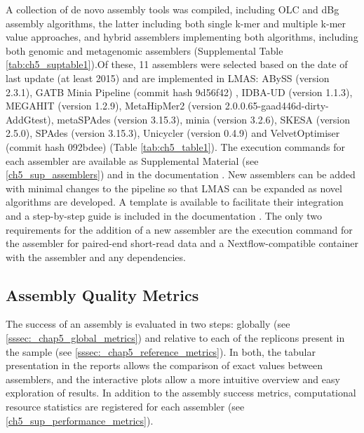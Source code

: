 A collection of de novo assembly tools was compiled, including \ac{OLC} and \ac{dBg} assembly algorithms, the latter including both single k-mer and multiple k-mer value approaches, and hybrid assemblers implementing both algorithms, including both genomic and metagenomic assemblers (Supplemental Table \ref{tab:ch5_suptable1}).Of these, 11 assemblers were selected based on the date of last update (at least 2015) and are implemented in LMAS: ABySS \cite{jackman_abyss_2017} (version 2.3.1), GATB Minia Pipeline \cite{noauthor_gatbgatb-minia-pipeline_2022} (commit hash 9d56f42) , IDBA-UD \cite{peng_idba-ud_2012} (version 1.1.3), MEGAHIT \cite{li_megahit_2015} (version 1.2.9), MetaHipMer2 \cite{georganas_extreme_2018} (version 2.0.0.65-gaad446d-dirty-AddGtest), metaSPAdes \cite{nurk_metaspades_2017} (version 3.15.3), minia \cite{chikhi_space-efficient_2013} (version 3.2.6), SKESA \cite{souvorov_skesa_2018} (version 2.5.0), SPAdes \cite{bankevich_spades_2012} (version 3.15.3), Unicycler \cite{wick_unicycler_2017} (version 0.4.9) and VelvetOptimiser \cite{seemann_velvetoptimiser_2021} (commit hash 092bdee) (Table \ref{tab:ch5_table1}). The execution commands for each assembler are available as Supplemental Material (see \ref{ch5_sup_assemblers}) and in the documentation \cite{noauthor_short-read_nodate}. 
New assemblers can be added with minimal changes to the pipeline so that LMAS can be expanded as novel algorithms are developed. A template is available to facilitate their integration and a step-by-step guide is included in the documentation \cite{noauthor_add_nodate}. The only two requirements for the addition of a new assembler are the execution command for the assembler for paired-end short-read data and a Nextflow-compatible container with the assembler and any dependencies.



\subsection{Assembly Quality Metrics}

The success of an assembly is evaluated in two steps: globally (see \ref{sssec:_chap5_global_metrics}) and relative to each of the replicons present in the sample (see \ref{sssec:_chap5_reference_metrics}). In both, the tabular presentation in the reports allows the comparison of exact values between assemblers, and the interactive plots allow a more intuitive overview and easy exploration of results. In addition to the assembly success metrics, computational resource statistics are registered for each assembler (see \ref{ch5_sup_performance_metrics}).

